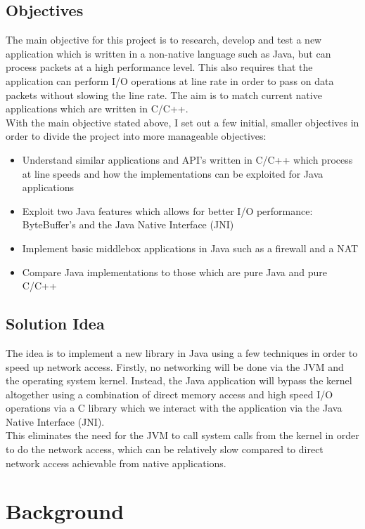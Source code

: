 \documentclass[a4paper, titlepage]{article}
\begin{document}
\subsection{Objectives}
The main objective for this project is to research, develop and test a new application which is written in a non-native language such as Java, but can process packets at a high performance level. This also requires that the application can perform I/O operations at line rate in order to pass on data packets without slowing the line rate. The aim is to match current native applications which are written in C/C++. \\
\newline
With the main objective stated above, I set out a few initial, smaller objectives in order to divide the project into more manageable objectives:
\begin{itemize}
	\item Understand similar applications and API's written in C/C++ which process at line speeds and how the implementations can be exploited for Java applications
	\item Exploit two Java features which allows for better I/O performance: ByteBuffer's and the Java Native Interface (JNI)
	\item Implement basic middlebox applications in Java such as a firewall and a NAT
	\item Compare Java implementations to those which are pure Java and pure C/C++
\end{itemize}

\subsection{Solution Idea}
The idea is to implement a new library in Java using a few techniques in order to speed up network access. Firstly, no networking will be done via the JVM and the operating system kernel. Instead, the Java application will bypass the kernel altogether using a combination of direct memory access and high speed I/O operations via a C library which we interact with the application via the Java Native Interface (JNI). \\
\newline
This eliminates the need for the JVM to call system calls from the kernel in order to do the network access, which can be relatively slow compared to direct network access achievable from native applications.

\newpage

\section{Background}
\end{document}
